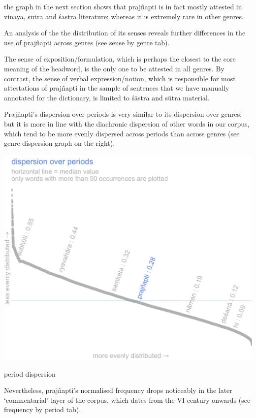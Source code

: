 \documentclass[
  letterpaper,
  DIV=11,
  numbers=noendperiod,
  oneside]{scrreprt}
\begin{document}
the graph in the next section shows that prajñapti is in fact mostly
attested in vinaya, sūtra and śāstra literature; whereas it is extremely
rare in other genres.

An analysis of the the distribution of its senses reveals further
differences in the use of prajñapti across genres (see sense by genre
tab).

The sense of exposition/formulation, which is perhaps the closest to the
core meaning of the headword, is the only one to be attested in all
genres. By contrast, the sense of verbal expression/notion, which is
responsible for most attestations of prajñapti in the sample of
sentences that we have manually annotated for the dictionary, is limited
to śāstra and sūtra material.

Prajñapti's dispersion over periods is very similar to its dispersion
over genres; but it is more in line with the diachronic dispersion of
other words in our corpus, which tend to be more evenly dispersed across
periods than across genres (see genre dispersion graph on the right).

\begin{marginfigure}

{\centering \includegraphics{./www/periodDP_prajJapti.webp}

}

\caption{\label{fig-perioddp}period dispersion}

\end{marginfigure}

Nevertheless, prajñapti's normalised frequency drops noticeably in the
later `commentarial' layer of the corpus, which dates from the VI
century onwards (see frequency by period tab).
\end{document}
